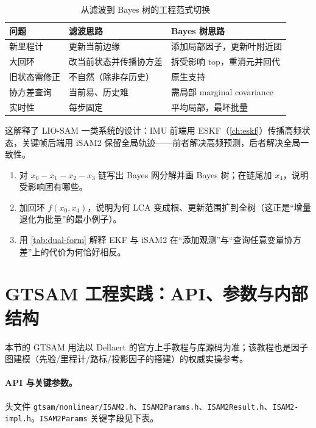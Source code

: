 \begin{table}[H]\centering\small
\caption{从滤波到 Bayes 树的工程范式切换}
\label{tab:paradigm}
\begin{tabular}{lll}
\toprule
问题 & 滤波思路 & Bayes 树思路 \\
\midrule
新里程计 & 更新当前边缘 & 添加局部因子，更新叶附近团 \\
大回环 & 改当前状态并传播协方差 & 拆受影响 top，重消元并回代 \\
旧状态需修正 & 不自然（除非存历史） & 原生支持 \\
协方差查询 & 当前易、历史难 & 需局部 marginal covariance \\
实时性 & 每步固定 & 平均局部，最坏批量 \\
\bottomrule
\end{tabular}
\end{table}

\noindent 这解释了 LIO-SAM 一类系统的设计：IMU 前端用 ESKF（\cref{ch:eskf}）传播高频状态，关键帧后端用 iSAM2 保留全局轨迹——前者解决高频预测，后者解决全局一致性。

\begin{practice}
\begin{enumerate}
  \item 对 $x_0-x_1-x_2-x_3$ 链写出 Bayes 网分解并画 Bayes 树；在链尾加 $x_4$，说明受影响团有哪些。
  \item 加回环 $f(x_0,x_4)$，说明为何 LCA 变成根、更新范围扩到全树（这正是“增量退化为批量”的最小例子）。
  \item 用 \cref{tab:dual-form} 解释 EKF 与 iSAM2 在“添加观测”与“查询任意变量协方差”上的代价为何恰好相反。
\end{enumerate}
\end{practice}

\section{GTSAM 工程实践：API、参数与内部结构}
\label{sec:isam-gtsam}

本节的 GTSAM 用法以 Dellaert 的官方上手教程\cite{dellaert2012gtsam}与库源码为准；该教程也是因子图建模（先验/里程计/路标/投影因子的搭建）的权威实操参考。

\paragraph{API 与关键参数。}
头文件 \texttt{gtsam/\allowbreak nonlinear/\allowbreak ISAM2.\allowbreak h}、\texttt{ISAM2Params.\allowbreak h}、\texttt{ISAM2Result.\allowbreak h}、\texttt{ISAM2-impl.\allowbreak h}。\texttt{ISAM2Params} 关键字段见下表。

